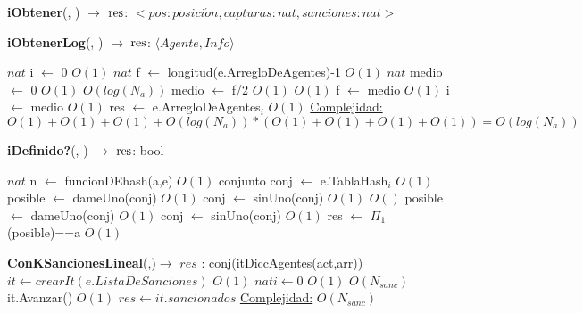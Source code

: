 \begin{Algoritmos}
\begin{algorithm}[H]{\textbf{iObtener}(, ) $\to$ $\res$: $<pos: posici\acute{o}n, capturas: nat, sanciones: nat>$}
\begin{algorithmic}
        \end{algorithmic}
    \end{algorithm}
    \begin{algorithm}[H]{\textbf{iObtenerLog}(, ) $\to$ $\res$: $\langle Agente,Info \rangle$}
        \begin{algorithmic}
         	\State $nat$ i $\gets$ 0 \Comment $O(1)$
         	\State $nat$ f $\gets$ longitud(e.ArregloDeAgentes)-1 \Comment $O(1)$
         	\State $nat$ medio $\gets$ 0 \Comment $O(1)$
            	\Comment $O(log(N_{a}))$
	         	\State medio $\gets$ f/2 \Comment $O(1)$
					\Comment $O(1)$
                	\State f $\gets$ medio \Comment $O(1)$
                \Else
                	\State i $\gets$ medio \Comment $O(1)$					
                \EndIf
			\EndWhile
            \State res $\gets$ e.ArregloDeAgentes$_{i}$ \Comment $O(1)$
            \Statex \underline{Complejidad:} $O(1)+O(1)+O(1)+O(log(N_{a}))*(O(1)+O(1)+O(1)+O(1))=O(log(N_{a}))$
        \end{algorithmic}
    \end{algorithm}
    \begin{algorithm}[H]{\textbf{iDefinido?}(, ) $\to$ $\res$: bool}
        \begin{algorithmic}
         	\State $nat$ n $\gets$ funcionDEhash(a,e) \Comment $O(1)$
			\State conjunto conj $\gets$ e.TablaHash$_{i}$ \Comment $O(1)$
			\State posible $\gets$ dameUno(conj) \Comment $O(1)$
            \State conj $\gets$ sinUno(conj) \Comment $O(1)$            
				\Comment $O()$
				\State posible $\gets$ dameUno(conj) \Comment $O(1)$
    	        \State conj $\gets$ sinUno(conj) \Comment $O(1)$            
			\EndWhile
            \State res $\gets$ $\Pi_{1}$(posible)==a \Comment $O(1)$
        \end{algorithmic}
    \end{algorithm}
    \begin{algorithm}[H]
        \begin{algorithmic}[1]
            \State \textbf{ConKSancionesLineal}(,)$\to$ $res$ : conj(itDiccAgentes(act,arr))
            \State 	$it \gets crearIt(e.ListaDeSanciones)$ \Comment $O(1)$
            \State $nat i \gets 0$ \Comment $O(1)$
            	\Comment $O(N_{sanc})$
	        	\State it.Avanzar() \Comment $O(1)$
	     	\EndWhile
            \State $res \gets it.sancionados$
            \Statex \underline{Complejidad:} $O(N_{sanc})$

\end{algorithmic}
\end{algorithm}
\end{Algoritmos}
